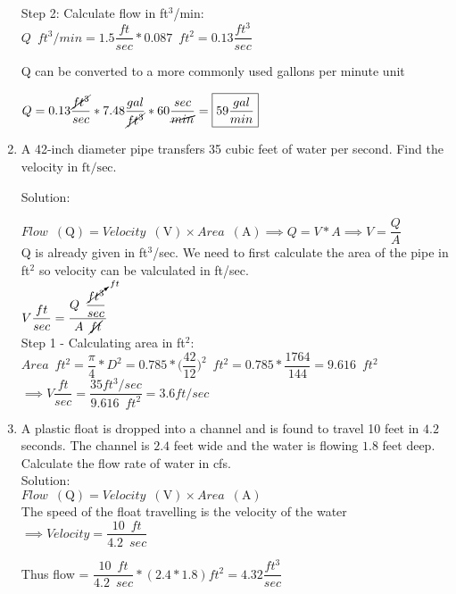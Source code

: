 \begin{enumerate}
Step 2: Calculate flow in ft$^3$/min:\\

$ Q \enspace ft^3/min = 1.5 \dfrac{ft}{sec}*0.087 \enspace ft^2 = 0.13 \dfrac{ft^3}{sec}$\\

\vspace{0.2cm}

Q can be converted to a more commonly used gallons per minute unit

\vspace{0.2cm}

$Q=0.13 \dfrac{\cancel{ft^3}}{sec}*7.48\dfrac{gal}{\cancel{ft^3}}*60\dfrac{sec}{\cancel{min}}=\boxed{59 \dfrac{gal}{min}}$
  \item A 42-inch diameter pipe transfers 35 cubic feet of water per second. Find the velocity in $\mathrm{ft} / \mathrm{sec}$. 

  Solution:\\
\vspace{0.2cm}

$Flow \enspace(\mathrm{Q})= Velocity \enspace(\mathrm{V})  \times Area \enspace(\mathrm{A}) \implies Q=V*A \implies V=\dfrac{Q}{A}$\\
Q is already given in ft${^3}$/sec.  We need to first calculate the area of the pipe in ft${^2}$ so velocity can be valculated in ft/sec.\\
\vspace{0.2cm}
$ V \dfrac{ft}{sec} = \dfrac{Q \enspace \dfrac{\cancelto{ft}{ft^3}}{sec}}{A \enspace\cancel{ft}}$\\
\vspace{0.2cm}
Step 1 - Calculating area in ft${^2}$:\\
\vspace{0.2cm}
$Area \enspace ft^2= \dfrac{\pi}{4}*D^2= 0.785*\Big(\dfrac{42}{12}\Big)^2 \enspace ft^2=0.785*\dfrac{1764}{144}=9.616 \enspace ft^2$\\
\vspace{0.2cm}
$\implies V \dfrac{ft}{sec} = \dfrac{ 35 ft^3/sec}{9.616 \enspace ft^2} = \boxed{3.6 ft/sec}$\\
\vspace{0.3cm} 

  
  \item A plastic float is dropped into a channel and is found to travel 10 feet in $4.2$ seconds. The channel is $2.4$ feet wide and the water is flowing $1.8$ feet deep. Calculate the flow rate of water in cfs.\\
  \vspace{0.2cm}
  Solution:\\
  $Flow \enspace(\mathrm{Q})= Velocity \enspace(\mathrm{V})  \times Area \enspace(\mathrm{A})$\\

The speed of the float travelling is the velocity of the water $\implies Velocity = \dfrac{10 \enspace ft}{4.2 \enspace sec}$

Thus flow = $\dfrac{10 \enspace ft}{4.2 \enspace sec} * (2.4*1.8) ft^2 = \boxed{4.32 \dfrac{ft^3}{sec}} $\\

\vspace{0.2cm}
\end{enumerate}
